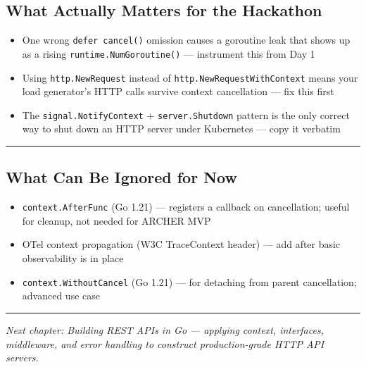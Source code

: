 \documentclass[11pt,a4paper,oneside]{book}
\providecommand{\tightlist}{\setlength{\itemsep}{0pt}\setlength{\parskip}{0pt}}
\begin{document}
\subsection{What Actually Matters for the
Hackathon}

\begin{itemize}
\tightlist
\item
  One wrong \texttt{defer\ cancel()} omission causes a goroutine leak
  that shows up as a rising \texttt{runtime.NumGoroutine()} ---
  instrument this from Day 1
\item
  Using \texttt{http.NewRequest} instead of
  \texttt{http.NewRequestWithContext} means your load generator's HTTP
  calls survive context cancellation --- fix this first
\item
  The \texttt{signal.NotifyContext} + \texttt{server.Shutdown} pattern
  is the only correct way to shut down an HTTP server under Kubernetes
  --- copy it verbatim
\end{itemize}

\begin{center}\rule{0.5\linewidth}{0.5pt}\end{center}

\subsection{What Can Be Ignored for
Now}

\begin{itemize}
\tightlist
\item
  \texttt{context.AfterFunc} (Go 1.21) --- registers a callback on
  cancellation; useful for cleanup, not needed for ARCHER MVP
\item
  OTel context propagation (W3C TraceContext header) --- add after basic
  observability is in place
\item
  \texttt{context.WithoutCancel} (Go 1.21) --- for detaching from parent
  cancellation; advanced use case
\end{itemize}

\begin{center}\rule{0.5\linewidth}{0.5pt}\end{center}

\emph{Next chapter: Building REST APIs in Go --- applying context,
interfaces, middleware, and error handling to construct production-grade
HTTP API servers.}
\end{document}
